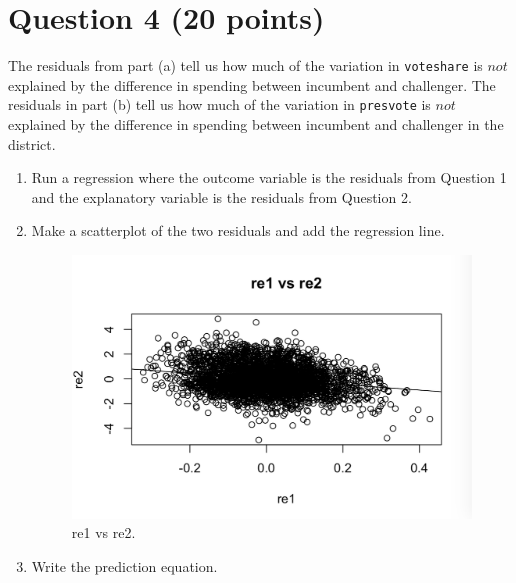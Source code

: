\documentclass[12pt,letterpaper]{article}
\begin{document}
	\section*{Question 4 (20 points)}
	\noindent The residuals from part (a) tell us how much of the variation in \texttt{voteshare} is $not$ explained by the difference in spending between incumbent and challenger. The residuals in part (b) tell us how much of the variation in \texttt{presvote} is $not$ explained by the difference in spending between incumbent and challenger in the district.
	\begin{enumerate}
		\item Run a regression where the outcome variable is the residuals from Question 1 and the explanatory variable is the residuals from Question 2.	
			  
		\item Make a scatterplot of the two residuals and add the regression line. 	
			  
				\begin{figure}[h!]
				\includegraphics[width=\linewidth]{PS34}
				\caption{re1 vs re2.}
				\label{fig:PS4}
			\end{figure}
		\item Write the prediction equation.
		  
	\end{enumerate}
	
	\newpage	
	
\end{document}
